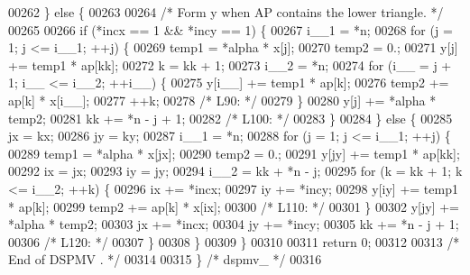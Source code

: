 \begin{DoxyCode}
00262     \} \textcolor{keywordflow}{else} \{
00263 
00264 \textcolor{comment}{/*        Form  y  when AP contains the lower triangle. */}
00265 
00266     \textcolor{keywordflow}{if} (*incx == 1 && *incy == 1) \{
00267         i\_\_1 = *n;
00268         \textcolor{keywordflow}{for} (j = 1; j <= i\_\_1; ++j) \{
00269         temp1 = *alpha * x[j];
00270         temp2 = 0.;
00271         y[j] += temp1 * ap[kk];
00272         k = kk + 1;
00273         i\_\_2 = *n;
00274         \textcolor{keywordflow}{for} (i\_\_ = j + 1; i\_\_ <= i\_\_2; ++i\_\_) \{
00275             y[i\_\_] += temp1 * ap[k];
00276             temp2 += ap[k] * x[i\_\_];
00277             ++k;
00278 \textcolor{comment}{/* L90: */}
00279         \}
00280         y[j] += *alpha * temp2;
00281         kk += *n - j + 1;
00282 \textcolor{comment}{/* L100: */}
00283         \}
00284     \} \textcolor{keywordflow}{else} \{
00285         jx = kx;
00286         jy = ky;
00287         i\_\_1 = *n;
00288         \textcolor{keywordflow}{for} (j = 1; j <= i\_\_1; ++j) \{
00289         temp1 = *alpha * x[jx];
00290         temp2 = 0.;
00291         y[jy] += temp1 * ap[kk];
00292         ix = jx;
00293         iy = jy;
00294         i\_\_2 = kk + *n - j;
00295         \textcolor{keywordflow}{for} (k = kk + 1; k <= i\_\_2; ++k) \{
00296             ix += *incx;
00297             iy += *incy;
00298             y[iy] += temp1 * ap[k];
00299             temp2 += ap[k] * x[ix];
00300 \textcolor{comment}{/* L110: */}
00301         \}
00302         y[jy] += *alpha * temp2;
00303         jx += *incx;
00304         jy += *incy;
00305         kk += *n - j + 1;
00306 \textcolor{comment}{/* L120: */}
00307         \}
00308     \}
00309     \}
00310 
00311     \textcolor{keywordflow}{return} 0;
00312 
00313 \textcolor{comment}{/*     End of DSPMV . */}
00314 
00315 \} \textcolor{comment}{/* dspmv\_ */}
00316 
\end{DoxyCode}
